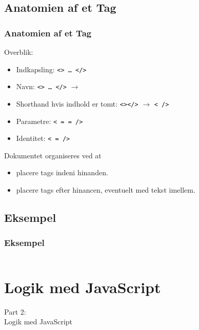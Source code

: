 \subsection{Anatomien af et Tag}
\begin{frame}
    \frametitle{Anatomien af et Tag}
    \vspace{3mm}
    Overblik:
    \begin{itemize}
      \item Indkapsling: \texttt{<> \ldots\  </>}
      \item Navn: \texttt{<> \ldots\  </>} $\rightarrow$ \texttt{}
      \item Shorthand hvis indhold er tomt: \texttt{<></>} $\rightarrow$ \texttt{< />}
      \item Parametre: \texttt{< = = />}
      \item Identitet: \texttt{< = />}
    \end{itemize}
    
    \vspace{5mm}
    Dokumentet organiseres ved at
    \begin{itemize}
      \item placere tags indeni hinanden.
      \item placere tags efter hinancen, eventuelt med tekst imellem.
    \end{itemize}
\end{frame}

\subsection{Eksempel}
\begin{frame}
    \frametitle{Eksempel}
    \inputminted[breaklines=true]{html}{../src/frontend/part1_html/index.html}
\end{frame}

\section{Logik med JavaScript}
\begin{frame}
    \vspace{25mm}
    \begin{center}
        \Huge{Part 2:\\Logik med JavaScript}
    \end{center}
\end{frame}

